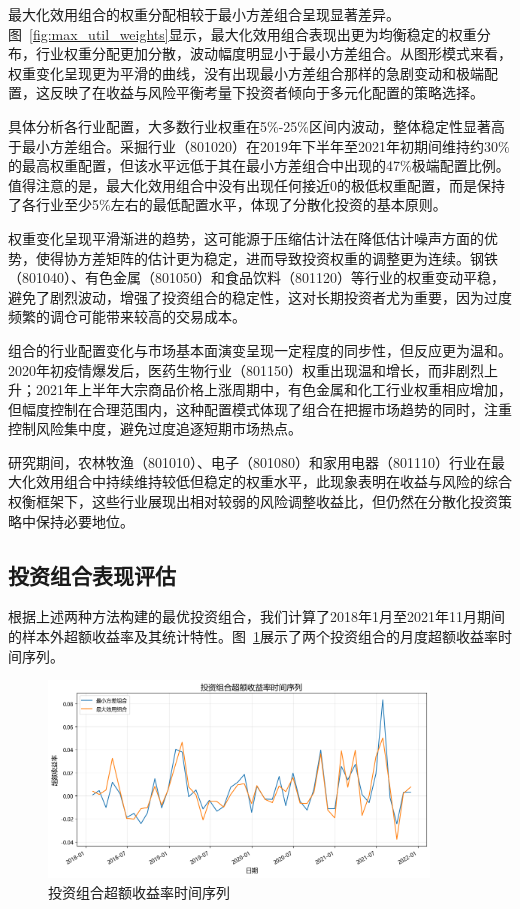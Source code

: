 \documentclass[12pt, a4paper]{article}
\begin{document}
最大化效用组合的权重分配相较于最小方差组合呈现显著差异。图~\ref{fig:max_util_weights}显示，最大化效用组合表现出更为均衡稳定的权重分布，行业权重分配更加分散，波动幅度明显小于最小方差组合。从图形模式来看，权重变化呈现更为平滑的曲线，没有出现最小方差组合那样的急剧变动和极端配置，这反映了在收益与风险平衡考量下投资者倾向于多元化配置的策略选择。

具体分析各行业配置，大多数行业权重在5\%-25\%区间内波动，整体稳定性显著高于最小方差组合。采掘行业（801020）在2019年下半年至2021年初期间维持约30\%的最高权重配置，但该水平远低于其在最小方差组合中出现的47\%极端配置比例。值得注意的是，最大化效用组合中没有出现任何接近0的极低权重配置，而是保持了各行业至少5\%左右的最低配置水平，体现了分散化投资的基本原则。

权重变化呈现平滑渐进的趋势，这可能源于压缩估计法在降低估计噪声方面的优势，使得协方差矩阵的估计更为稳定，进而导致投资权重的调整更为连续。钢铁（801040）、有色金属（801050）和食品饮料（801120）等行业的权重变动平稳，避免了剧烈波动，增强了投资组合的稳定性，这对长期投资者尤为重要，因为过度频繁的调仓可能带来较高的交易成本。

组合的行业配置变化与市场基本面演变呈现一定程度的同步性，但反应更为温和。2020年初疫情爆发后，医药生物行业（801150）权重出现温和增长，而非剧烈上升；2021年上半年大宗商品价格上涨周期中，有色金属和化工行业权重相应增加，但幅度控制在合理范围内，这种配置模式体现了组合在把握市场趋势的同时，注重控制风险集中度，避免过度追逐短期市场热点。

研究期间，农林牧渔（801010）、电子（801080）和家用电器（801110）行业在最大化效用组合中持续维持较低但稳定的权重水平，此现象表明在收益与风险的综合权衡框架下，这些行业展现出相对较弱的风险调整收益比，但仍然在分散化投资策略中保持必要地位。

\subsection{投资组合表现评估}

根据上述两种方法构建的最优投资组合，我们计算了2018年1月至2021年11月期间的样本外超额收益率及其统计特性。图~\ref{fig:portfolio_returns}展示了两个投资组合的月度超额收益率时间序列。

\begin{figure}[htbp]
\centering
\includegraphics[width=0.9\textwidth]{./img/portfolio_returns.png}
\caption{投资组合超额收益率时间序列}
\label{fig:portfolio_returns}
\end{figure}
\end{document}
